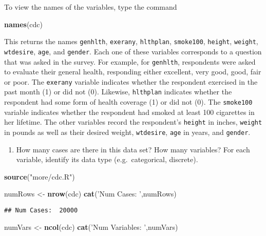 \documentclass[]{article}
\newenvironment{Shaded}{\begin{snugshade}}{\end{snugshade}}
\newcommand{\KeywordTok}[1]{\textcolor[rgb]{0.13,0.29,0.53}{\textbf{{#1}}}}
\newcommand{\StringTok}[1]{\textcolor[rgb]{0.31,0.60,0.02}{{#1}}}
\newcommand{\NormalTok}[1]{{#1}}
\begin{document}
To view the names of the variables, type the command

\begin{Shaded}
\begin{Highlighting}[]
\KeywordTok{names}\NormalTok{(cdc)}
\end{Highlighting}
\end{Shaded}

This returns the names \texttt{genhlth}, \texttt{exerany},
\texttt{hlthplan}, \texttt{smoke100}, \texttt{height}, \texttt{weight},
\texttt{wtdesire}, \texttt{age}, and \texttt{gender}. Each one of these
variables corresponds to a question that was asked in the survey. For
example, for \texttt{genhlth}, respondents were asked to evaluate their
general health, responding either excellent, very good, good, fair or
poor. The \texttt{exerany} variable indicates whether the respondent
exercised in the past month (1) or did not (0). Likewise,
\texttt{hlthplan} indicates whether the respondent had some form of
health coverage (1) or did not (0). The \texttt{smoke100} variable
indicates whether the respondent had smoked at least 100 cigarettes in
her lifetime. The other variables record the respondent's
\texttt{height} in inches, \texttt{weight} in pounds as well as their
desired weight, \texttt{wtdesire}, \texttt{age} in years, and
\texttt{gender}.

\begin{enumerate}
\def\labelenumi{\arabic{enumi}.}
\itemsep1pt\parskip0pt
\item
  How many cases are there in this data set? How many variables? For
  each variable, identify its data type (e.g.~categorical, discrete).
\end{enumerate}

\begin{Shaded}
\begin{Highlighting}[]
\KeywordTok{source}\NormalTok{(}\StringTok{"more/cdc.R"}\NormalTok{)}

\NormalTok{numRows <-}\StringTok{ }\KeywordTok{nrow}\NormalTok{(cdc)}
\KeywordTok{cat}\NormalTok{(}\StringTok{'Num Cases: '}\NormalTok{,numRows)}
\end{Highlighting}
\end{Shaded}

\begin{verbatim}
## Num Cases:  20000
\end{verbatim}

\begin{Shaded}
\begin{Highlighting}[]
\NormalTok{numVars <-}\StringTok{ }\KeywordTok{ncol}\NormalTok{(cdc)}
\KeywordTok{cat}\NormalTok{(}\StringTok{'Num Variables: '}\NormalTok{,numVars)}
\end{Highlighting}
\end{Shaded}
\end{document}
